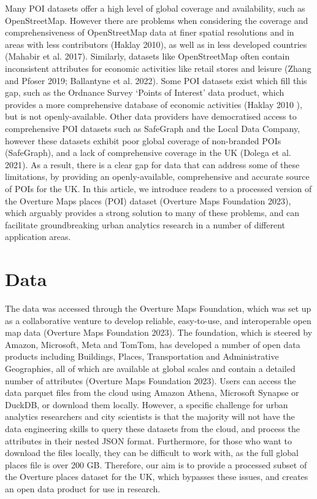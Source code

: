 \documentclass[
]{article}
\begin{document}
Many POI datasets offer a high level of global coverage and
availability, such as OpenStreetMap. However there are problems when
considering the coverage and comprehensiveness of OpenStreetMap data at
finer spatial resolutions and in areas with less contributors (Haklay
2010), as well as in less developed countries (Mahabir et al. 2017).
Similarly, datasets like OpenStreetMap often contain inconsistent
attributes for economic activities like retail stores and leisure (Zhang
and Pfoser 2019; Ballantyne et al. 2022). Some POI datasets exist which
fill this gap, such as the Ordnance Survey `Points of Interest' data
product, which provides a more comprehensive database of economic
activities (Haklay 2010 ), but is not openly-available. Other data
providers have democratised access to comprehensive POI datasets such as
SafeGraph and the Local Data Company, however these datasets exhibit
poor global coverage of non-branded POIs (SafeGraph), and a lack of
comprehensive coverage in the UK (Dolega et al. 2021). As a result,
there is a clear gap for data that can address some of these
limitations, by providing an openly-available, comprehensive and
accurate source of POIs for the UK. In this article, we introduce
readers to a processed version of the Overture Maps places (POI) dataset
(Overture Maps Foundation 2023), which arguably provides a strong
solution to many of these problems, and can facilitate groundbreaking
urban analytics research in a number of different application areas.

\section{Data}\label{data}

The data was accessed through the Overture Maps Foundation, which was
set up as a collaborative venture to develop reliable, easy-to-use, and
interoperable open map data (Overture Maps Foundation 2023). The
foundation, which is steered by Amazon, Microsoft, Meta and TomTom, has
developed a number of open data products including Buildings, Places,
Transportation and Administrative Geographies, all of which are
available at global scales and contain a detailed number of attributes
(Overture Maps Foundation 2023). Users can access the data parquet files
from the cloud using Amazon Athena, Microsoft Synapse or DuckDB, or
download them locally. However, a specific challenge for urban analytics
researchers and city scientists is that the majority will not have the
data engineering skills to query these datasets from the cloud, and
process the attributes in their nested JSON format. Furthermore, for
those who want to download the files locally, they can be difficult to
work with, as the full global places file is over 200 GB. Therefore, our
aim is to provide a processed subset of the Overture places dataset for
the UK, which bypasses these issues, and creates an open data product
for use in research.
\end{document}
